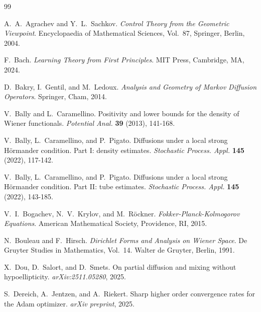 \documentclass[11pt, a4paper,leqno]{amsart}
\theoremstyle{definition}
\numberwithin{equation}{section}
\begin{document}
   \begin{thebibliography}{99}






A.~A.~Agrachev and Y.~L.~Sachkov.
\newblock \emph{Control Theory from the Geometric Viewpoint}.
\newblock Encyclopaedia of Mathematical Sciences, Vol.~87, Springer, Berlin, 2004.





F.~Bach.
\newblock \emph{Learning Theory from First Principles}.
\newblock MIT Press, Cambridge, MA, 2024.

D.~Bakry, I.~Gentil, and M.~Ledoux.
\newblock \emph{Analysis and Geometry of Markov Diffusion Operators}.
\newblock Springer, Cham, 2014.



V.~Bally and L.~Caramellino.
\newblock Positivity and lower bounds for the density of Wiener functionals.
\newblock \emph{Potential Anal.} \textbf{39} (2013), 141-168.



V.~Bally, L.~Caramellino, and P.~Pigato.
\newblock Diffusions under a local strong H\"ormander condition. Part I: density estimates.
\newblock \emph{Stochastic Process. Appl.} \textbf{145} (2022), 117-142.

V.~Bally, L.~Caramellino, and P.~Pigato.
\newblock Diffusions under a local strong H\"ormander condition. Part II: tube estimates.
\newblock \emph{Stochastic Process. Appl.} \textbf{145} (2022), 143-185.



V.~I.~Bogachev, N.~V.~Krylov, and M.~R\"ockner.
\newblock \emph{Fokker-Planck-Kolmogorov Equations}.
\newblock American Mathematical Society, Providence, RI, 2015.

N.~Bouleau and F.~Hirsch.
\newblock \emph{Dirichlet Forms and Analysis on Wiener Space}.
\newblock De Gruyter Studies in Mathematics, Vol.~14.
\newblock Walter de Gruyter, Berlin, 1991.

X.~Dou, D.~Salort, and D.~Smets.
\newblock On partial diffusion and mixing without hypoellipticity.
\newblock \emph{arXiv:2511.05280}, 2025.

S.~Dereich, A.~Jentzen, and A.~Riekert.
\newblock Sharp higher order convergence rates for the Adam optimizer.
\newblock \emph{arXiv preprint}, 2025.


\end{thebibliography}
\end{document}
